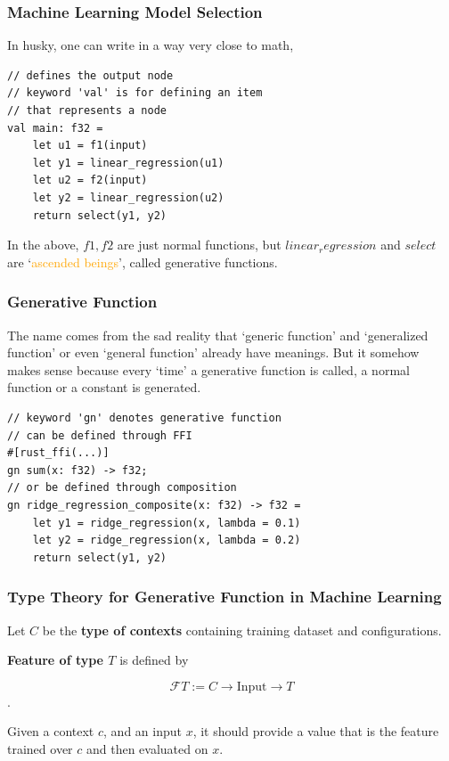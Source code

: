\documentclass{beamer}   	%
\theoremstyle{definition}
\begin{document}
\begin{frame}[fragile]
\frametitle{Machine Learning Model Selection}

In husky, one can write in a way very close to math,
\begin{verbatim}
// defines the output node
// keyword 'val' is for defining an item
// that represents a node
val main: f32 =
	let u1 = f1(input)
	let y1 = linear_regression(u1)
	let u2 = f2(input)
	let y2 = linear_regression(u2)
	return select(y1, y2)
\end{verbatim}

In the above, $f1, f2$ are just normal functions, but $linear_regression$ and $select$ are `\textcolor{orange}{ascended beings}', called generative functions.
	
\end{frame}

\begin{frame}[fragile]
\frametitle{Generative Function}

The name comes from the sad reality that `generic function' and `generalized function' or even `general function' already have meanings. But it somehow makes sense because every `time' a generative function is called, a normal function or a constant is generated.

\begin{verbatim}
// keyword 'gn' denotes generative function
// can be defined through FFI
#[rust_ffi(...)]
gn sum(x: f32) -> f32;
// or be defined through composition
gn ridge_regression_composite(x: f32) -> f32 =
	let y1 = ridge_regression(x, lambda = 0.1)
	let y2 = ridge_regression(x, lambda = 0.2)
	return select(y1, y2)
\end{verbatim}
	
\end{frame}

\begin{frame}
\frametitle{Type Theory for Generative Function in Machine Learning}

Let $C$ be the \textbf{type of contexts} containing training dataset and configurations.

\textbf{Feature of type $T$} is defined by

$$\mathscr{F}T:= C\to \text{Input} \to T$$.

Given a context $c$, and an input $x$, it should provide a value that is the feature trained over $c$ and then evaluated on $x$.
\end{frame}
\end{document}
